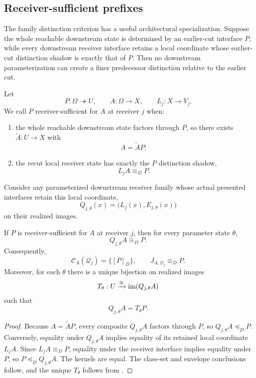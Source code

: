 \subsection{Receiver-sufficient prefixes}\label{subsec:receiver-sufficient-prefix}

The family distinction criterion has a useful architectural specialization. Suppose the whole reachable downstream state is determined by an earlier-cut interface $P$, while every downstream receiver interface retains a local coordinate whose earlier-cut distinction shadow is exactly that of $P$. Then no downstream parameterization can create a finer predecessor distinction relative to the earlier cut.

\begin{definition}\label{def:receiver-sufficient-prefix-v13}
Let
\[
P:\Omega\twoheadrightarrow U,
\qquad
A:\Omega\to X,
\qquad
L_j:X\to V_j.
\]
We call $P$ receiver-sufficient for $A$ at receiver $j$ when:
\begin{enumerate}[label=(\roman*)]
\item the whole reachable downstream state factors through $P$, so there exists $\widetilde A:U\to X$ with
\[
A=\widetilde A P;
\]
\item the recut local receiver state has exactly the $P$ distinction shadow,
\[
L_jA\equiv_DP.
\]
\end{enumerate}
\end{definition}

Consider any parameterized downstream receiver family whose actual presented interfaces retain this local coordinate,
\[
Q_{j,\theta}(x)=\bigl(L_j(x),E_{j,\theta}(x)\bigr)
\]
on their realized images.

\begin{proposition}\label{prop:receiver-sufficient-collapse-v13}
If $P$ is receiver-sufficient for $A$ at receiver $j$, then for every parameter state $\theta$,
\[
\boxed{Q_{j,\theta}A\equiv_DP.}
\]
Consequently,
\[
\boxed{
\mathcal C_A(\mathcal Q_j)=\{[P]_D\},
\qquad
J_{A,\mathcal Q_j}\equiv_DP.
}
\]
Moreover, for each $\theta$ there is a unique bijection on realized images
\[
T_\theta:U\xrightarrow{\cong}\operatorname{im}(Q_{j,\theta}A)
\]
such that
\[
\boxed{Q_{j,\theta}A=T_\theta P.}
\]
\end{proposition}

\begin{proof}
Because $A=\widetilde A P$, every composite $Q_{j,\theta}A$ factors through $P$, so $Q_{j,\theta}A\preceq_DP$. Conversely, equality under $Q_{j,\theta}A$ implies equality of its retained local coordinate $L_jA$. Since $L_jA\equiv_DP$, equality under the receiver interface implies equality under $P$, so $P\preceq_DQ_{j,\theta}A$. The kernels are equal. The class-set and envelope conclusions follow, and the unique $T_\theta$ follows from .
\end{proof}

